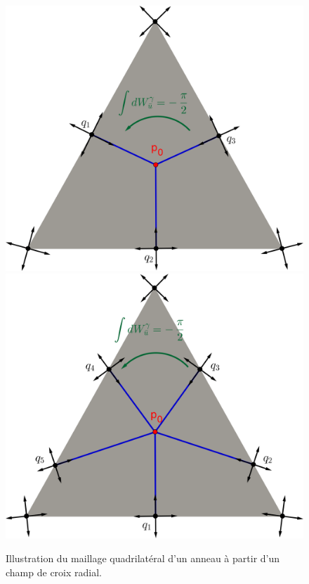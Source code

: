 \begin{figure}[!h]
\centering
\includegraphics[scale=0.755]{images/triangle separatrices 3.png}
\includegraphics[scale=0.755]{images/triangle separatrices 5.png}
\caption{Illustration du maillage quadrilatéral d'un anneau à partir d'un champ de croix radial.}
\label{fig:init_streams_int}
\end{figure}

